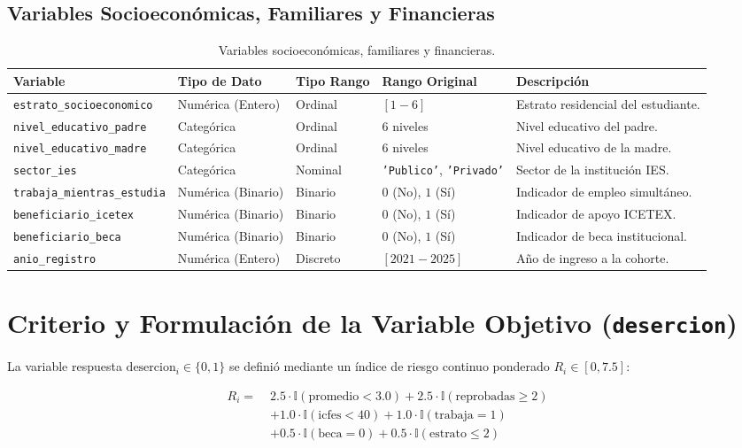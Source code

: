\documentclass[11pt,a4paper]{article}
\begin{document}
\subsection{Variables Socioeconómicas, Familiares y Financieras}
\begin{table}[htbp]
\centering
\small
\begin{tabularx}{\textwidth}{l l l l X}
\toprule
\textbf{Variable} & \textbf{Tipo de Dato} & \textbf{Tipo Rango} & \textbf{Rango Original} & \textbf{Descripción} \\
\midrule
\texttt{estrato\_socioeconomico} & Numérica (Entero) & Ordinal & $[1 - 6]$ & Estrato residencial del estudiante. \\
\texttt{nivel\_educativo\_padre} & Categórica & Ordinal & 6 niveles & Nivel educativo del padre. \\
\texttt{nivel\_educativo\_madre} & Categórica & Ordinal & 6 niveles & Nivel educativo de la madre. \\
\texttt{sector\_ies} & Categórica & Nominal & \texttt{'Publico'}, \texttt{'Privado'} & Sector de la institución IES. \\
\texttt{trabaja\_mientras\_estudia} & Numérica (Binario) & Binario & $0$ (No), $1$ (Sí) & Indicador de empleo simultáneo. \\
\texttt{beneficiario\_icetex} & Numérica (Binario) & Binario & $0$ (No), $1$ (Sí) & Indicador de apoyo ICETEX. \\
\texttt{beneficiario\_beca} & Numérica (Binario) & Binario & $0$ (No), $1$ (Sí) & Indicador de beca institucional. \\
\texttt{anio\_registro} & Numérica (Entero) & Discreto & $[2021 - 2025]$ & Año de ingreso a la cohorte. \\
\bottomrule
\end{tabularx}
\caption{Variables socioeconómicas, familiares y financieras.}
\end{table}

\section{Criterio y Formulación de la Variable Objetivo (\texttt{desercion})}

La variable respuesta $\text{desercion}_i \in \{0, 1\}$ se definió mediante un índice de riesgo continuo ponderado $R_i \in [0, 7.5]$:

\begin{align}
R_i = \; & 2.5 \cdot \mathbb{I}(\text{promedio} < 3.0) + 2.5 \cdot \mathbb{I}(\text{reprobadas} \ge 2) \nonumber \\
& + 1.0 \cdot \mathbb{I}(\text{icfes} < 40) + 1.0 \cdot \mathbb{I}(\text{trabaja} = 1) \nonumber \\
& + 0.5 \cdot \mathbb{I}(\text{beca} = 0) + 0.5 \cdot \mathbb{I}(\text{estrato} \le 2)
\end{align}
\end{document}
